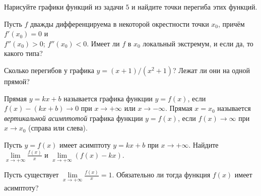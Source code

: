 \documentclass[a4paper, 12pt]{article}
\newcommand{\0}[1]{\overline{#1}}
\begin{document}
Нарисуйте графики функций из задачи $5$
и найдите точки перегиба этих функций.

Пусть $f$ дважды дифференцируема в некоторой окрестности точки $x_0$,
прич\"ем $f'(x_0)=0$ и\\
$f''(x_0)>0$;
$f''(x_0)<0$.
Имеет ли $f$ в $x_0$ локальный экстремум, и если да, то какого типа?


Сколько перегибов у графика $y=(x+1)/(x^2+1)$?
Лежат ли они на одной прямой?


 Прямая $y=kx+b$ называется %
графика функции $y=f(x)$, %
если\break %
$f(x)-(kx+b)\to0$ при $x\to+\infty$ или $x\to-\infty$.
Прямая $x=x_0$ называется {\it вертикальной асимптотой\/}
графика функции $y=f(x)$, %
если $f(x)\rightarrow \infty$ при $x\rightarrow x_0$ (справа или слева).


Пусть $y=f(x)$ имеет асимптоту
$y=kx+b$ при $x\to+\infty$. Найдите $\lim\limits_{x\to+\infty}\frac{f(x)}{x}$
и $\lim\limits_{x\to+\infty}(f(x)-kx)$.

Пусть существует $\lim\limits_{x\rightarrow+\infty}\frac{f(x)}x=1$.
Обязательно ли тогда функция $f(x)$ имеет асимптоту?





\end{document}
